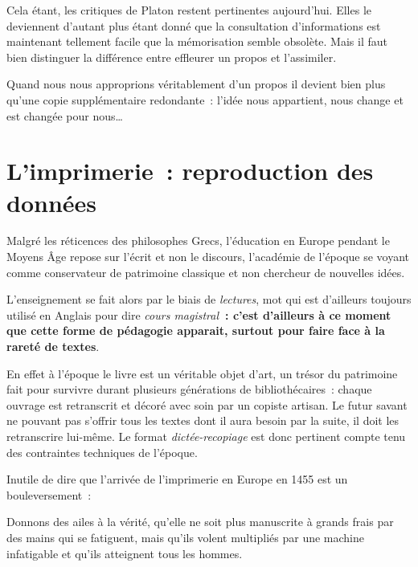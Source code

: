 Cela étant, les critiques de Platon restent pertinentes aujourd'hui. Elles le deviennent d'autant plus étant donné que la consultation d'informations est maintenant tellement facile que la mémorisation semble obsolète. Mais il faut bien distinguer la différence entre effleurer un propos et l'assimiler.

Quand nous nous approprions véritablement d'un propos il devient bien plus qu'une copie supplémentaire redondante~: l'idée nous appartient, nous change et est changée pour nous\ldots

\chapter{L'imprimerie~: reproduction des données}

Malgré les réticences des philosophes Grecs, l'éducation en Europe pendant le Moyens Âge repose sur l'écrit et non le discours, l'académie de l'époque se voyant comme conservateur de patrimoine classique et non chercheur de nouvelles idées\cite{friesen-the-lecture}.

L'enseignement se fait alors par le biais de \emph{lectures}, mot qui est d'ailleurs toujours utilisé en Anglais pour dire \emph{cours magistral}\textbf{~: c'est d'ailleurs à ce moment que cette forme de pédagogie apparait, surtout pour faire face à la rareté de textes}.

En effet à l'époque le livre est un véritable objet d'art, un trésor du patrimoine fait pour survivre durant plusieurs générations de bibliothécaires~: chaque ouvrage est retranscrit et décoré avec soin par un copiste artisan. Le futur savant ne pouvant pas s'offrir tous les textes dont il aura besoin par la suite, il doit les retranscrire lui-même\cite{friesen-the-lecture}. Le format \emph{dictée-recopiage} est donc pertinent compte tenu des contraintes techniques de l'époque. 

Inutile de dire que l'arrivée de l'imprimerie en Europe en 1455\cite{walsham2003} est un bouleversement~:

\begin{coolquote}
Donnons des ailes à la vérité, qu'elle ne soit plus manuscrite à grands frais par des mains qui se fatiguent, mais qu'ils volent multipliés par une machine infatigable et qu'ils atteignent tous les hommes.
\end{coolquote}

